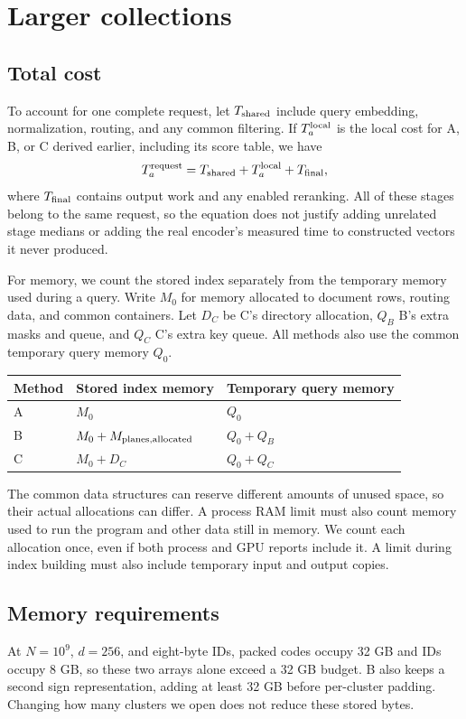 \section{Larger collections}
\subsection{Total cost}
To account for one complete request, let $T_{\rm shared}$ include query embedding,
normalization, routing, and any common filtering. If $T_a^{\rm local}$ is the local cost for
A, B, or C derived earlier, including its score table, we have
\begin{equation}
T_a^{\rm request}=T_{\rm shared}+T_a^{\rm local}+T_{\rm final},
\label{eq:total}
\end{equation}
where $T_{\rm final}$ contains output work and any enabled reranking. All of these stages
belong to the same request, so the equation does not justify adding unrelated stage medians
or adding the real encoder's measured time to constructed vectors it never produced.

For memory, we count the stored index separately from the temporary memory used during
a query. Write $M_0$ for memory allocated to document rows, routing data, and common containers.
Let $D_C$ be C's directory allocation, $Q_B$ B's extra masks and queue, and $Q_C$ C's extra
key queue. All methods also use the common temporary query memory $Q_0$.
\begin{center}
\begin{tabular}{@{}lll@{}}\toprule
Method & Stored index memory & Temporary query memory\\\midrule
A & $M_0$ & $Q_0$\\
B & $M_0+M_{\rm planes,allocated}$ & $Q_0+Q_B$\\
C & $M_0+D_C$ & $Q_0+Q_C$\\\bottomrule
\end{tabular}
\end{center}
The common data structures can reserve different amounts of unused space, so their actual
allocations can differ. A process RAM limit must also count memory used to run the program
and other data still in memory. We count each allocation once, even if both process and GPU
reports include it. A limit during index building must also include temporary input and output copies.

\subsection{Memory requirements}
At $N=10^9$, $d=256$, and eight-byte IDs, packed codes occupy 32 GB and IDs occupy 8 GB,
so these two arrays alone exceed a 32 GB budget. B also keeps a second sign representation,
adding at least 32 GB before per-cluster padding. Changing how many clusters we open
does not reduce these stored bytes.

